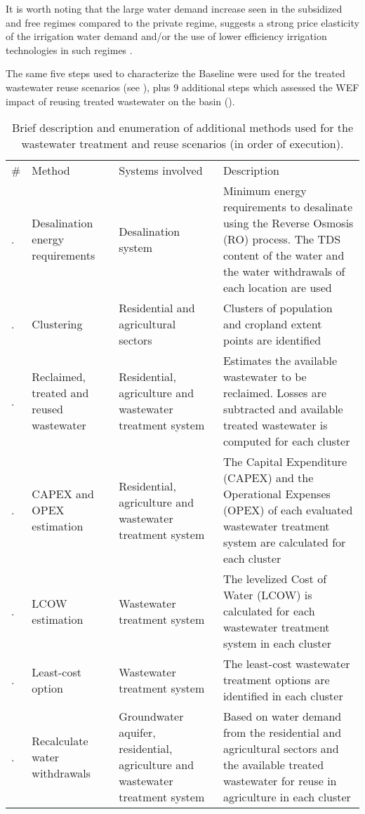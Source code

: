 It is worth noting that the large water demand increase seen in the subsidized and free regimes compared to the private regime, suggests a strong price elasticity of the irrigation water demand and/or the use of lower efficiency irrigation technologies in such regimes \cite{Socioeconomicaspectsirrigation2014}.

The same five steps used to characterize the Baseline were used for the treated wastewater reuse scenarios (see ), plus 9 additional steps which assessed the WEF impact of reusing treated wastewater on the basin ().

\begin{table*}[!ht]
    \caption{\label{tbl:methodsScenarios}Brief description and enumeration of additional methods used for the wastewater treatment and reuse scenarios (in order of execution).}
	\footnotesize{
	\begin{tabular}{@{}l P{1.1in} P{1.2in} P{3.12in}}
		\br
		\# & Method & Systems involved & Description\\
		. & Desalination energy requirements & Desalination system & Minimum energy requirements to desalinate using the Reverse Osmosis (RO) process. The TDS content of the water and the water withdrawals of each location are used \\
	    . & Clustering & Residential and agricultural sectors & Clusters of population and cropland extent points are identified\\
	    . & Reclaimed, treated and reused wastewater & Residential, agriculture and wastewater treatment system & Estimates the available wastewater to be reclaimed. Losses are subtracted and available treated wastewater is computed for each cluster \\
	    . & CAPEX and OPEX estimation & Residential, agriculture and wastewater treatment system & The Capital Expenditure (CAPEX) and the Operational Expenses (OPEX) of each evaluated wastewater treatment system are calculated for each cluster \\
	    . & LCOW estimation & Wastewater treatment system & The levelized Cost of Water (LCOW) is calculated for each wastewater treatment system in each cluster\\
	    . & Least-cost option & Wastewater treatment system & The least-cost wastewater treatment options are identified in each cluster\\
	    . & Recalculate water withdrawals & Groundwater aquifer, residential, agriculture and wastewater treatment system & Based on water demand  from the residential and agricultural sectors and the available treated wastewater for reuse in agriculture in each cluster\\

\end{tabular}}
\end{table*}
